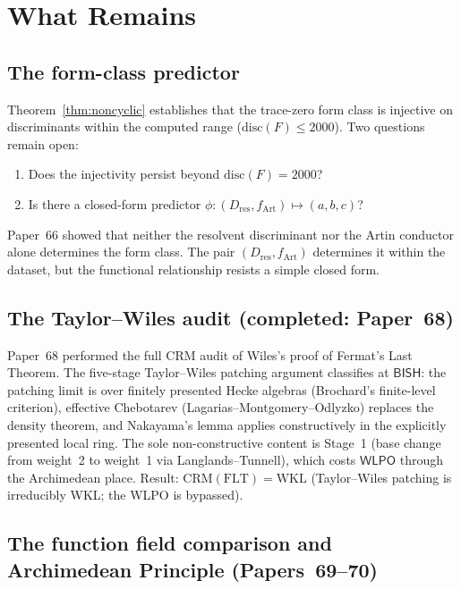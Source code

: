 \documentclass[11pt]{article}
\theoremstyle{plain}
\theoremstyle{definition}
\theoremstyle{remark}
\newcommand{\disc}{\mathrm{disc}}
\newcommand{\BISH}{\mathsf{BISH}}
\newcommand{\WLPO}{\mathsf{WLPO}}
\begin{document}
\section{What Remains}\label{sec:future}

\subsection{The form-class predictor}

Theorem~\ref{thm:noncyclic} establishes that the trace-zero form
class is injective on discriminants within the computed range
($\disc(F) \le 2000$).  Two questions remain open:

\begin{enumerate}
\item Does the injectivity persist beyond $\disc(F) = 2000$?
\item Is there a closed-form predictor
  $\phi \colon (D_{\mathrm{res}}, f_{\mathrm{Art}}) \mapsto
  (a, b, c)$?
\end{enumerate}

Paper~66 showed that neither the resolvent discriminant nor the
Artin conductor alone determines the form class.  The pair
$(D_{\mathrm{res}}, f_{\mathrm{Art}})$ determines it within the
dataset, but the functional relationship resists a simple
closed form.

\subsection{The Taylor--Wiles audit (completed: Paper~68)}

Paper~68 performed the full CRM audit of Wiles's proof of
Fermat's Last Theorem.  The five-stage Taylor--Wiles patching
argument classifies at $\BISH$: the patching limit is over
finitely presented Hecke algebras (Brochard's finite-level
criterion), effective Chebotarev (Lagarias--Montgomery--Odlyzko)
replaces the density theorem, and Nakayama's lemma applies
constructively in the explicitly presented local ring.  The sole
non-constructive content is Stage~1 (base change from weight~2 to
weight~1 via Langlands--Tunnell), which costs $\WLPO$ through
the Archimedean place.  Result: $\mathrm{CRM}(\mathrm{FLT}) = \mathrm{WKL}$ (Taylor--Wiles patching is irreducibly WKL; the WLPO is bypassed).

\subsection{The function field comparison and Archimedean
  Principle (Papers~69--70)}
\end{document}
